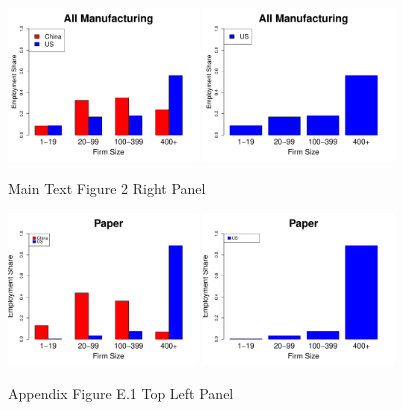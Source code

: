 \documentclass[twoside,12pt,leqno]{article}
\begin{document}
\begin{figure}[h]
    \begin{center}
    \includegraphics[width=0.45\textwidth]{./Figures/Figure2_Right.pdf}
    \includegraphics[width=0.45\textwidth]{./Figures/Figure2_US_Right.pdf}
    \caption{Main Text Figure 2 Right Panel}
    \end{center}
\end{figure}

\begin{figure}[h]
    \begin{center}
    \includegraphics[width=0.45\textwidth]{./Figures/FigureE1_TopLeft.pdf}
    \includegraphics[width=0.45\textwidth]{./Figures/FigureE1_US_TopLeft.pdf}
    \caption{Appendix Figure E.1 Top Left Panel}
    \end{center}
\end{figure}
\end{document}
